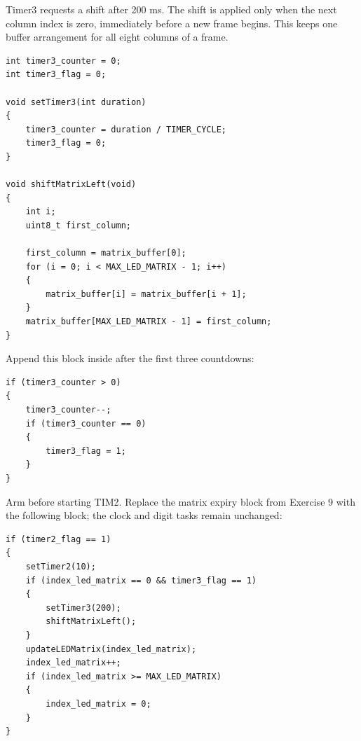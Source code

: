 \documentclass[a4paper]{article}
\newcommand{\code}[1]{\texttt{\detokenize{#1}}}
\begin{document}
Timer3 requests a shift after 200 ms. The shift is applied only when the next
column index is zero, immediately before a new frame begins. This keeps one
buffer arrangement for all eight columns of a frame.
\par\noindent\begin{minipage}{\linewidth}
\begin{lstlisting}[caption={Animation timer and circular shift helper}]
int timer3_counter = 0;
int timer3_flag = 0;

void setTimer3(int duration)
{
    timer3_counter = duration / TIMER_CYCLE;
    timer3_flag = 0;
}

void shiftMatrixLeft(void)
{
    int i;
    uint8_t first_column;

    first_column = matrix_buffer[0];
    for (i = 0; i < MAX_LED_MATRIX - 1; i++)
    {
        matrix_buffer[i] = matrix_buffer[i + 1];
    }
    matrix_buffer[MAX_LED_MATRIX - 1] = first_column;
}
\end{lstlisting}
\end{minipage}\par
Append this block inside \code{timer_run()} after the first three countdowns:
\par\noindent\begin{minipage}{\linewidth}
\begin{lstlisting}[caption={Animation countdown maintenance}]
if (timer3_counter > 0)
{
    timer3_counter--;
    if (timer3_counter == 0)
    {
        timer3_flag = 1;
    }
}
\end{lstlisting}
\end{minipage}\par
Arm \code{setTimer3(200)} before starting TIM2. Replace the matrix expiry
block from Exercise 9 with the following block; the clock and digit tasks
remain unchanged:
\par\noindent\begin{minipage}{\linewidth}
\begin{lstlisting}[caption={Frame-aligned animation task in main}]
if (timer2_flag == 1)
{
    setTimer2(10);
    if (index_led_matrix == 0 && timer3_flag == 1)
    {
        setTimer3(200);
        shiftMatrixLeft();
    }
    updateLEDMatrix(index_led_matrix);
    index_led_matrix++;
    if (index_led_matrix >= MAX_LED_MATRIX)
    {
        index_led_matrix = 0;
    }
}
\end{lstlisting}
\end{minipage}\par
\end{document}
